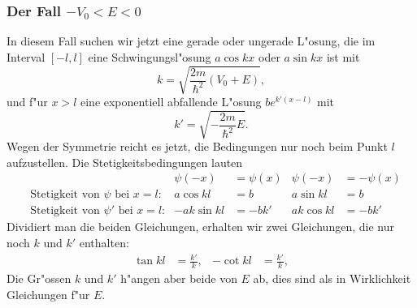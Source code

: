 \subsubsection{Der Fall $-V_0 < E < 0$}
In diesem Fall suchen wir jetzt eine gerade oder ungerade L"osung, die
im Interval $[-l,l]$ eine Schwingungsl"osung $a \cos kx$ oder $a \sin kx$
ist mit 
\[
k=\sqrt{\frac{2m}{\hbar^2}(V_0+E)},
\]
und f"ur $x>l$ eine exponentiell abfallende L"osung $be^{k'(x-l)}$
mit
\[
k'=\sqrt{-\frac{2m}{\hbar^2}E}.
\]
Wegen der Symmetrie reicht es jetzt, die Bedingungen nur noch beim
Punkt $l$ aufzustellen.
Die Stetigkeitsbedingungen lauten 
\begin{align*}
&&\psi(-x)&=\psi(x)	&	\psi(-x)&=-\psi(x)\\
&\text{Stetigkeit von $\psi$ bei $x=l$:}&
	a\cos kl&= b	&	a\sin kl&=b \\
&\text{Stetigkeit von $\psi'$ bei $x=l$:}&
	-ak\sin kl&=-bk'&     ak\cos kl&=-bk'
\end{align*}
Dividiert man die beiden Gleichungen, erhalten wir zwei
Gleichungen, die nur noch $k$ und $k'$ enthalten:
\begin{align}
\tan kl&=\frac{k'}{k},
&-\cot kl&=\frac{k'}{k},
\label{skript:potentialtopf-k-gleichungen}
\end{align}
Die Gr"ossen $k$ und $k'$ h"angen aber beide von $E$ ab, dies sind
als in Wirklichkeit Gleichungen f"ur $E$.

